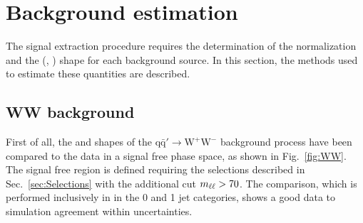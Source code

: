 \section{Background estimation}
\label{sec:Backgrounds}
The signal extraction procedure requires the determination of the normalization and the (\mll, \mt)
shape for each background source. In this section, the methods used to estimate these quantities are described.



\subsection{WW background \label{sec:WWBackground}}

First of all, the \mll and \mt shapes of the $\mathrm{q\bar{q}'\to W^{+}W^{-}}$ background process have been compared to the data in a signal free phase space, as shown in Fig.~\ref{fig:WW}. The signal free region is defined requiring the selections described in Sec.~\ref{sec:Selections} with the additional cut $m_{\ell\ell}>70$\GeV. The comparison, which is performed inclusively in \pth in the 0 and 1 jet categories, shows a good data to simulation agreement within uncertainties.

